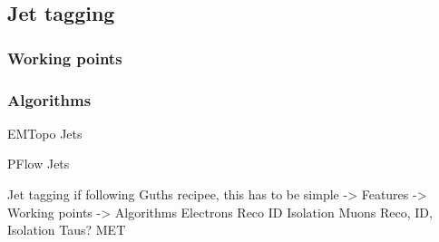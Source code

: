 \subsection{Jet tagging}

\subsubsection{Working points}

\subsubsection{Algorithms}

EMTopo Jets

PFlow Jets

Jet tagging  if following Guths recipee, this has to be simple
    -> Features
    -> Working points
    -> Algorithms
Electrons
    Reco
    ID
    Isolation
Muons
    Reco, ID, Isolation
Taus?
MET